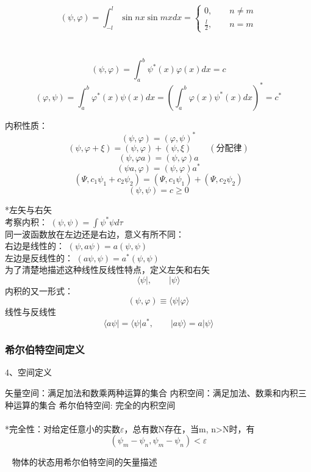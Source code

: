 \begin{frame} 
    \frametitle{}
    \例 [3. 求定义在实数空间的两函数的内积]{\[\psi(x)=\sin nx, \varphi(x)=\sin mx\]}
    \解 ~ \[(\psi, \varphi)=\int_{-l} ^{l} \sin nx \sin mx dx=\begin{cases}
         0, \qquad n\neq m \\
        \frac{l}{2} , \qquad n=m
    \end{cases}
    \]
\end{frame} 

\begin{frame} 
    \frametitle{}
    \例 [4. 求定义在复数空间的两函数的内积]{}
    \解 ~ \[(\psi, \varphi)=\int_a ^b \psi^*(x)  \varphi(x) dx=c\]
    \[(\varphi,\psi)=\int_a ^b \varphi^*(x)\psi(x) dx = (\int_a ^b \varphi(x)\psi^*(x) dx) ^* =c^*\]
\end{frame} 

\begin{frame}
    内积性质：
    \[(\psi, \varphi)= (\varphi,\psi)^* \]
    \[(\psi, \varphi+\xi)= (\psi, \varphi) + (\psi, \xi)\qquad (\text{分配律})\]
    \[(\psi, \varphi a)= (\psi, \varphi )a \]
    \[(\psi a, \varphi )= (\psi, \varphi )a^* \]    
    \[(\Psi,c_1\psi_1+c_2\psi_2)=(\Psi,c_1\psi_1)+(\Psi,c_2\psi_2)\]
    \[(\psi,\psi)= c\ge 0\]
\end{frame}

\begin{frame}{}
    *左矢与右矢\\ \vspace{0.6em}
    考察内积： $(\psi,\psi)=\int\psi^*\psi d\tau$ \\
    同一波函数放在左边还是右边，意义有所不同： \\
    右边是线性的：  $(\psi,a\psi)=a (\psi,\psi)$ \\
    左边是反线性的：   $(a\psi,\psi)=a^* (\psi,\psi)$  \\
    为了清楚地描述这种线性反线性特点，定义左矢和右矢
    $$\langle \psi |, \qquad |\psi \rangle $$ 
    内积的又一形式：\[(\psi,\varphi)\equiv \langle \psi | \varphi \rangle\]
    线性与反线性$$\langle a\psi | = \langle \psi |a^* ,\qquad |a\psi \rangle = a|\psi \rangle$$ 
\end{frame}

\begin{frame}
    \frametitle{希尔伯特空间定义}
    4、空间定义\\
   \begin{itemize}
       \Item 矢量空间：满足加法和数乘两种运算的集合
       \Item 内积空间：满足加法、数乘和内积三种运算的集合
       \Item 希尔伯特空间:  完全的内积空间\\
       ~~ \\
       *完全性：对给定任意小的实数$\varepsilon$，总有数N存在，当m, n>N时，有\\
       $$ (\psi_m -\psi_n, \psi_m -\psi_n )< \varepsilon $$
   \end{itemize} 
   \Tips ~ 物体的状态用希尔伯特空间的矢量描述
\end{frame} 

